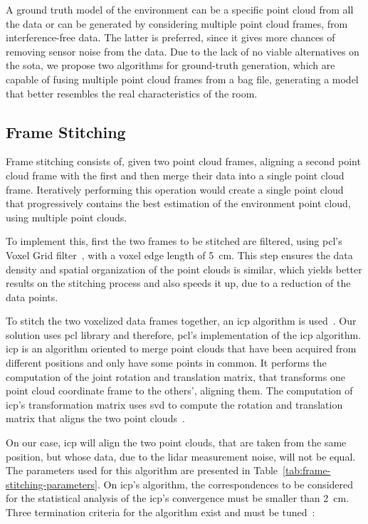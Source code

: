 A ground truth model of the environment can be a specific point cloud from all the data or can be generated by considering multiple point cloud frames, from interference-free data. The latter is preferred, since it gives more chances of removing sensor noise from the data. Due to the lack of no viable alternatives on the \acl{sota}, we propose two algorithms for ground-truth generation, which are capable of fusing multiple point cloud frames from a bag file, generating a model that better resembles the real characteristics of the room.


\subsection{Frame Stitching}
\label{subsec:lidar-interference:frame-stitching}
Frame stitching consists of, given two point cloud frames, aligning a second point cloud frame with the first and then merge their data into a single point cloud frame. Iteratively performing this operation would create a single point cloud that progressively contains the best estimation of the environment point cloud, using multiple point clouds.

To implement this, first the two frames to be stitched are filtered, using \ac{pcl}'s Voxel Grid filter~\cite{PCL}, with a voxel edge length of \SI{5}{\centi\meter}. This step ensures the data density and spatial organization of the point clouds is similar, which yields better results on the stitching process and also speeds it up, due to a reduction of the data points.

To stitch the two voxelized data frames together, an \ac{icp} algorithm is used~\cite{Rusinkiewicz2001}. Our solution uses \ac{pcl} library and therefore, \ac{pcl}'s implementation of the \ac{icp} algorithm. \ac{icp} is an algorithm oriented to merge point clouds that have been acquired from different positions and only have some points in common. It performs the computation of the joint rotation and translation matrix, that transforms one point cloud coordinate frame to the others', aligning them. The computation of \ac{icp}'s transformation matrix uses \ac{svd} to compute the rotation and translation matrix that aligns the two point clouds~\cite{SVD, mvg_book}.

On our case, \ac{icp} will align the two point clouds, that are taken from the same position, but whose data, due to the \ac{lidar} measurement noise, will not be equal. The parameters used for this algorithm are presented in Table~\ref{tab:frame-stitching-parameters}. On \ac{icp}'s algorithm, the correspondences to be considered for the statistical analysis of the \ac{icp}'s convergence must be smaller than \SI{2}{\centi\meter}. Three termination criteria for the algorithm exist and must be tuned~\cite{PCL}:

